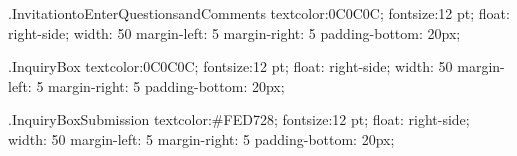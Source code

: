.InvitationtoEnterQuestionsandComments {
     textcolor:0C0C0C;
	 fontsize:12 pt;
	 float: right-side;
	 width: 50%
	 margin-left: 5%
	 margin-right: 5%
     padding-bottom: 20px;	 
	 } 

.InquiryBox {
     textcolor:0C0C0C;
	 fontsize:12 pt;
	 float: right-side;
	 width: 50%
	 margin-left: 5%
	 margin-right: 5%
     padding-bottom: 20px;	 
	 } 

	 
.InquiryBoxSubmission {
     textcolor:#FED728;
	 fontsize:12 pt;
	 float: right-side;
	 width: 50%
	 margin-left: 5%
	 margin-right: 5%
     padding-bottom: 20px;	 
	 } 
	 
	 
	 
	 
	 
	 
	 